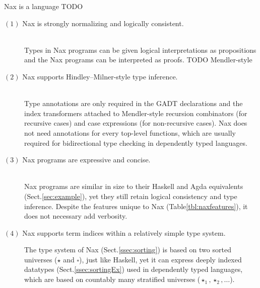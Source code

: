 Nax is a language TODO \newpage
\begin{description}
\item[$(1)$ Nax is strongly normalizing and logically consistent.]~\\
Types in Nax programs can be given logical interpretations as propositions
and the Nax programs can be interpreted as proofs. TODO Mendler-style

\item[$(2)$ Nax supports Hindley--Milner-style type inference.]~\\
Type annotations are only required in the GADT declarations and
the index transformers attached to Mendler-style recursion combinators
(for recursive cases) and case expressions (for non-recursive cases).
Nax does not need annotations for every top-level functions, which are usually
required for bidirectional type checking in dependently typed languages.

\item[$(3)$ Nax programs are expressive and concise.]~\\
Nax programs are similar in size to their Haskell and Agda equivalents
(Sect.\;\ref{sec:example}), yet they still retain logical consistency
and type inference. Despite the features unique to Nax
(Table\;\ref{tbl:naxfeatures}), it does not necessary add verbosity.

\item[$(4)$ Nax supports term indices within a relatively simple type system.]
The type system of Nax (Sect.\;\ref{ssec:sorting}) is based on
two sorted universes ($\star$ and $\square$), just like Haskell,
yet it can express deeply indexed datatypes (Sect.\;\ref{ssec:sortingEx})
used in dependently typed languages, which are based on countably many
stratified universes ($\star_1,\star_2,\dots$).
\end{description}

